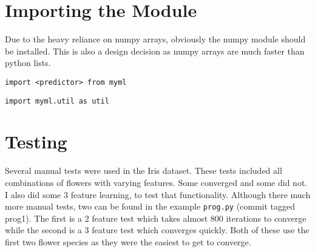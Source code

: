 \documentclass{article}
\begin{document}
\section{Importing the Module}

Due to the heavy reliance on numpy arrays, obviously the numpy module should
be installed. This is also a design decision as numpy arrays are much faster
than python lists.

\texttt{import <predictor> from myml}

\texttt{import myml.util as util}

\section{Testing}

Several manual tests were used in the Iris dataset. These tests included all
combinations of flowers with varying features. Some converged and some did not.
I also did some 3 feature learning, to test that functionality. Although there
much more manual tests, two can be found in the example \texttt{prog.py} (commit
tagged prog1). The first is a 2 feature test which takes almost 800 iterations
to converge while the second is a 3 feature test which converges quickly. Both
of these use the first two flower species as they were the easiest to get to
converge.
\end{document}
